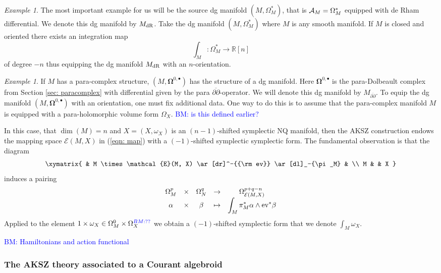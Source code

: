 \documentclass{article}
\newcommand{\RR}{\mathbb{R}}
\newcommand{\cE}{\mathcal{E}}
\newcommand{\p}{\partial}
\newcommand{\pd}{\overline{\p\!\!\!\p}}
\theoremstyle{definition}
\theoremstyle{remark}
\newtheorem{Ex}[theorem]{Example}
\def\brian{\textcolor{blue}{BM: }\textcolor{blue}}
\begin{document}
\begin{Ex}
The most important example for us will be the source dg manifold $(M, \Omega^*_M)$, that is $\mathcal{A}_M = \Omega^*_M$ equipped with de Rham differential. 
We denote this dg manifold by $M_{\rm dR}$.
Take the dg manifold $(M, \Omega^*_M)$ where $M$ is any smooth manifold. 
If $M$ is closed and oriented there exists an integration map
\[
\int_M : \Omega^*_M \to \RR[n]
\]
of degree $-n$ thus equipping the dg manifold $M_{\rm dR}$ with an $n$-orientation. 
\end{Ex}

\begin{Ex}
If $M$ has a para-complex structure, $(M, \mathbf{\Omega}^{0,\bullet})$ has the structure of a dg manifold. 
Here $\mathbf{\Omega}^{0,\bullet}$ is the para-Dolbeault complex from Section \ref{sec: paracomplex} with differential given by the para $\pd$-operator. 
We will denote this dg manifold by $M_{\pd}$. 
To equip the dg manifold $(M, \mathbf{\Omega}^{0,\bullet})$ with an orientation, one must fix additional data. 
One way to do this is to assume that the para-complex manifold $M$ is equipped with a para-holomorphic volume form $\Omega_X$. \brian{is this defined earlier?}
\end{Ex}

In this case, that $\dim(M) = n$ and $X = (X, \omega_X)$ is an $(n-1)$-shifted symplectic NQ manifold, then the AKSZ construction endows the mapping space $\cE(M, X)$ in (\ref{eqn: map}) with a $(-1)$-shifted symplectic symplectic form. 
The fundamental observation is that the diagram
\[
\xymatrix{
& M \times \cE(M, X) \ar[dr]^-{{\rm ev}} \ar[dl]_-{\pi_M} & \\
M & & X
}
\]
induces a pairing
\[
\begin{array}{ccccc}
 \Omega^p_M & \times & \Omega^q_N & \to & \Omega^{p+q-n}_{\cE(M, X)} \\
\displaystyle \alpha & \times & \beta & \mapsto & \displaystyle \int_M \pi_M^* \alpha \wedge {\rm ev}^* \beta 
 \end{array}
 \]
Applied to the element $1 \times \omega_X \in \Omega^0_M \times \Omega^{\brian{??}}_X$ we obtain a $(-1)$-shifted symplectic form that we denote $\int_M \omega_X$.

\brian{Hamiltonians and action functional}

\subsubsection{The AKSZ theory associated to a Courant algebroid}
\end{document}
